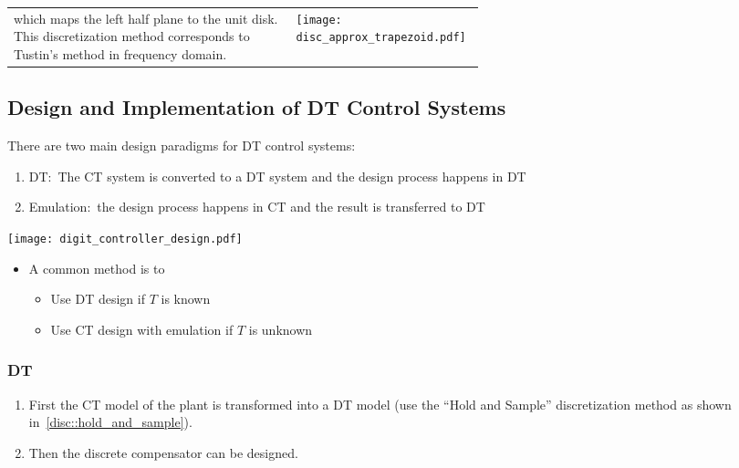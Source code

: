 \begin{tabularx}{\linewidth}{@{}m{0.6\linewidth}X@{}}
    which maps the left half plane to the unit disk. This discretization method corresponds to Tustin's method in frequency domain.
     &
    \texttt{[image: disc\_approx\_trapezoid.pdf]}
\end{tabularx}

\subsection{Design and Implementation of DT Control Systems}
There are two main design paradigms for DT control systems:
\begin{enumerate}
    \item DT:\ The CT system is converted to a DT system and the design process happens in DT
    \item Emulation:\ the design process happens in CT and the result is transferred to DT
\end{enumerate}

\begin{center}
    \texttt{[image: digit\_controller\_design.pdf]}
\end{center}

\newpar{}

\begin{itemize}
    \item A common method is to
          \begin{itemize}
              \item Use DT design if $T$ is known
              \item Use CT design with emulation if $T$ is unknown
          \end{itemize}
\end{itemize}

\subsubsection{DT}
\begin{enumerate}
    \item First the CT model of the plant is transformed into a DT model (use the ``Hold and Sample'' discretization method as shown in~\ref{disc::hold_and_sample}).
    \item Then the discrete compensator can be designed.
\end{enumerate}

